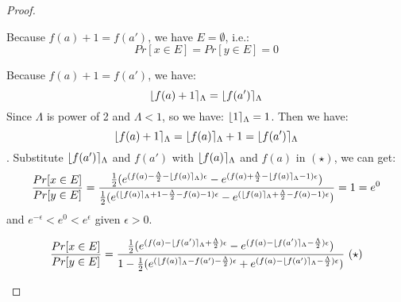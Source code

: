\documentclass[a4paper,11pt]{article}
\begin{document}
\begin{proof}
\begin{itemize}
\begin{itemize}
	Because $f(a) + 1 = f(a')$, we have $E = \emptyset$, i.e.:
	$$Pr[x \in E] = Pr[y \in E] = 0$$ 
	
	Because $f(a) + 1 = f(a')$, we have:
	$$\lfloor f(a) + 1 \rceil_{\Lambda} = \lfloor f(a') \rceil_{\Lambda}$$
	Since $\Lambda$ is power of 2 and $\Lambda < 1$, so we have: $\lfloor 1 \rceil_{\Lambda} = 1$. Then we have:
	$$\lfloor f(a) + 1 \rceil_{\Lambda} = \lfloor f(a) \rceil_{\Lambda} + 1 = \lfloor f(a') \rceil_{\Lambda} $$.
	Substitute $\lfloor f(a') \rceil_{\Lambda}$ and $f(a')$ with $\lfloor f(a) \rceil_{\Lambda}$ and $f(a)$ in $(\star)$, we can get:
	\[
	\frac{Pr[x \in E]}{Pr[y \in E]} 
	= \frac{
			\frac{1}{2}(
				e^{(f(a) - \frac{\Lambda}{2} - \lfloor f(a) \rceil_{\Lambda})\epsilon}
				- e^{(f(a) + \frac{\Lambda}{2} - \lfloor f(a) \rceil_{\Lambda} - 1)\epsilon})
			}
			{
			\frac{1}{2}(
				e^{(\lfloor f(a) \rceil_{\Lambda} + 1 - \frac{\Lambda}{2} - f(a) - 1)\epsilon}
				- e^{(\lfloor f(a) \rceil_{\Lambda} + \frac{\Lambda}{2}  - f(a) - 1)\epsilon})
			} = 1 = e^{0} 
	\]
	and $e^{-\epsilon} < e^{0} < e^{\epsilon}$ given $\epsilon > 0$.
	\end{itemize}


	\[
	\frac{Pr[x \in E]}{Pr[y \in E]} 
	= \frac{
			\frac{1}{2}(
				e^{(f(a) - \round{f(a')}_{\Lambda} + \frac{\Lambda}{2})\epsilon}
				- e^{(f(a) - \round{f(a')}_{\Lambda} - \frac{\Lambda}{2})\epsilon})
			}
			{1 - {\frac{1}{2}(
				e^{(\round{f(a)}_{\Lambda} - f(a') - \frac{\Lambda}{2})\epsilon}
				+ e^{(f(a) - \round{f(a')}_{\Lambda} -\frac{\Lambda}{2})\epsilon})}
			}~(\star)
	\]


\end{itemize}
\end{proof}
\end{document}
